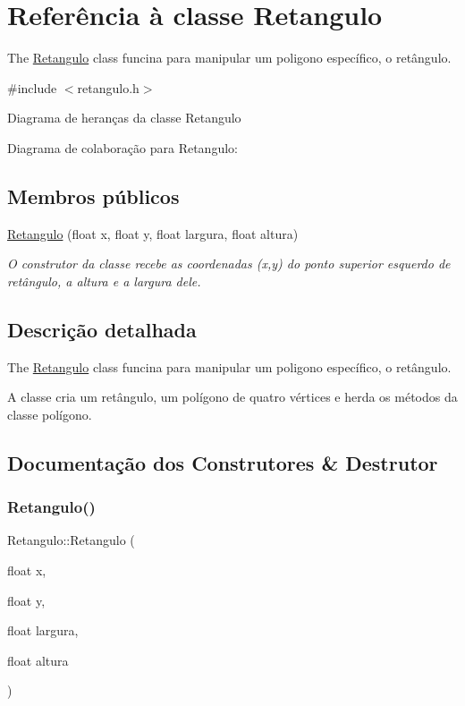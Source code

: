 \hypertarget{class_retangulo}{}\section{Referência à classe Retangulo}
\label{class_retangulo}


The \hyperlink{class_retangulo}{Retangulo} class funcina para manipular um poligono específico, o retângulo.  




{\ttfamily \#include $<$retangulo.\+h$>$}



Diagrama de heranças da classe Retangulo


Diagrama de colaboração para Retangulo\+:
\subsection*{Membros públicos}
\begin{DoxyCompactItemize}
\item 
\hyperlink{class_retangulo_acca1dd211eefc8dc04658c943c0d1122}{Retangulo} (float x, float y, float largura, float altura)
\begin{DoxyCompactList}\small\item\em O construtor da classe recebe as coordenadas (x,y) do ponto superior esquerdo de retângulo, a altura e a largura dele. \end{DoxyCompactList}\end{DoxyCompactItemize}


\subsection{Descrição detalhada}
The \hyperlink{class_retangulo}{Retangulo} class funcina para manipular um poligono específico, o retângulo. 

A classe cria um retângulo, um polígono de quatro vértices e herda os métodos da classe polígono. 

\subsection{Documentação dos Construtores \& Destrutor}
\mbox{\label{class_retangulo_acca1dd211eefc8dc04658c943c0d1122}} 
\subsubsection{\texorpdfstring{Retangulo()}{Retangulo()}}
{\footnotesize\ttfamily Retangulo\+::\+Retangulo (\begin{DoxyParamCaption}\item[{float}]{x,  }\item[{float}]{y,  }\item[{float}]{largura,  }\item[{float}]{altura }\end{DoxyParamCaption})}



